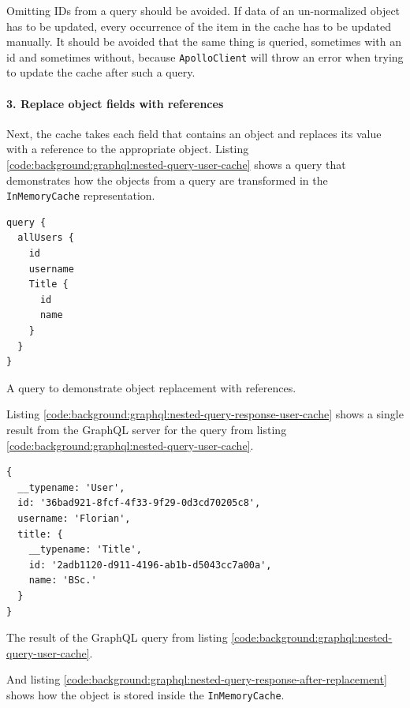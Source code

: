 \noindent Omitting IDs from a query should be avoided. If data of an un-normalized object has to be updated, every occurrence of the item in the cache has to be updated manually. It should be avoided that the same thing is queried, sometimes with an id and sometimes without, because \texttt{ApolloClient} will throw an error when trying to update the cache after such a query.

\paragraph{3. Replace object fields with references}\label{paragraph:background:graphql:apollo-server-client:data-normalization:replace-object-fields-with-references}

Next, the cache takes each field that contains an object and replaces its value with a reference to the appropriate object. Listing \ref{code:background:graphql:nested-query-user-cache} shows a query that demonstrates how the objects from a query are transformed in the \texttt{InMemoryCache} representation.

\ifshowListings
\begin{listing}[H]
    \begin{verbatim}
query {
  allUsers {
    id
    username
    Title {
      id
      name
    }
  }
}
    \end{verbatim}
    \caption{A query to demonstrate object replacement with references.}\label{code:background:graphql:nested-query-user-cache}
\end{listing}
\fi

Listing \ref{code:background:graphql:nested-query-response-user-cache} shows a single result from the GraphQL server for the query from listing \ref{code:background:graphql:nested-query-user-cache}.

\ifshowListings
\begin{listing}[H]
    \begin{verbatim}
{
  __typename: 'User',
  id: '36bad921-8fcf-4f33-9f29-0d3cd70205c8',
  username: 'Florian',
  title: {
    __typename: 'Title',
    id: '2adb1120-d911-4196-ab1b-d5043cc7a00a',
    name: 'BSc.'
  }
}
    \end{verbatim}
    \caption{The result of the GraphQL query from listing \ref{code:background:graphql:nested-query-user-cache}.} \label{code:background:graphql:nested-query-response-user-cache}
\end{listing}
\fi

And listing \ref{code:background:graphql:nested-query-response-after-replacement} shows how the object is stored inside the \texttt{InMemoryCache}.

